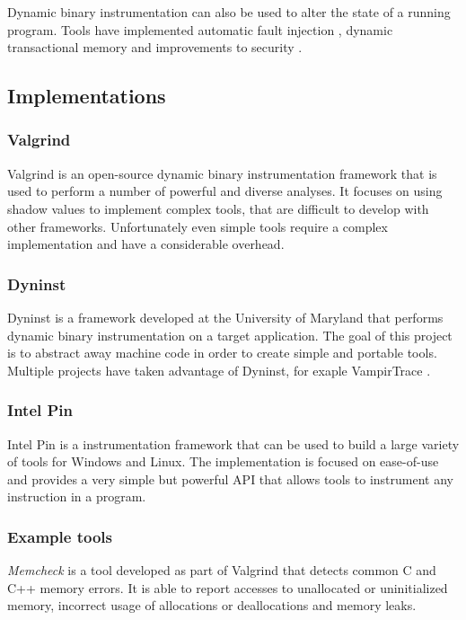 Dynamic binary instrumentation can also be used to alter the state of a running program. Tools have implemented automatic fault injection \cite{faultinject}, dynamic transactional memory \cite{dynamicstm} and improvements to security \cite{dynamicstackprotect}.

\subsection{Implementations}

\subsubsection{Valgrind}

Valgrind \cite{valgrind} is an open-source dynamic binary instrumentation framework that is used to perform a number of powerful and diverse analyses. It focuses on using shadow values to implement complex tools, that are difficult to develop with other frameworks. Unfortunately even simple tools require a complex implementation and have a considerable overhead.

\subsubsection{Dyninst}

Dyninst \cite{dyninst} is a framework developed at the University of Maryland that performs dynamic binary instrumentation on a target application. The goal of this project is to abstract away machine code in order to create simple and portable tools. Multiple projects have taken advantage of Dyninst, for exaple VampirTrace \cite{vampirtrace}.

\subsubsection{Intel Pin}

Intel Pin \cite{pin} is a instrumentation framework that can be used to build a large variety of tools for Windows and Linux. The implementation is focused on ease-of-use and provides a very simple but powerful API that allows tools to instrument any instruction in a program.

\subsubsection{Example tools}

\emph{Memcheck} \cite{memcheck} is a tool developed as part of Valgrind that detects common C and C++ memory errors. It is able to report accesses to unallocated or uninitialized memory, incorrect usage of allocations or deallocations and memory leaks.


